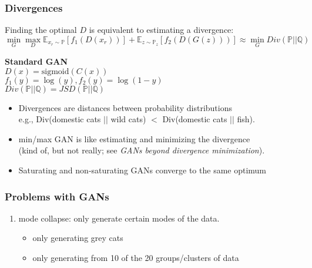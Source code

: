 \documentclass[t]{beamer}
\begin{document}

\begin{frame}
\frametitle{Divergences}
Finding the optimal $D$ is equivalent to estimating a divergence:
$$\min_G \max_D \mathbb{E}_{x_r \sim \mathbb{P}}\left[ f_1(D(x_r)) \right] + \mathbb{E}_{z \sim \mathbb{P}_z} \left[ f_2(D(G(z))) \right] \approx \min_G Div(\mathbb{P}||\mathbb{Q})$$ 

\begin{center}
	\textbf{Standard GAN} \\
	$D(x)=\text{sigmoid}(C(x))$ \\
	$f_1(y)=\log(y), f_2(y)=\log(1-y)$ \\
	$Div(\mathbb{P}||\mathbb{Q}) =  JSD(\mathbb{P}||\mathbb{Q})$
\end{center}

\begin{itemize}
	\item Divergences are distances between probability distributions \\ e.g., Div(domestic cats $||$ wild cats) $<$ Div(domestic cats $||$ fish).
	\item min/max GAN is like estimating and minimizing the divergence \\ (kind of, but not really; see \textit{GANs beyond divergence minimization}).
	\item Saturating and non-saturating GANs converge to the same optimum
\end{itemize}

\end{frame}


\begin{frame}
	\frametitle{Problems with GANs}
	
	\begin{enumerate}
		\item mode collapse: only generate certain modes of the data.
		\begin{itemize}
			\item only generating grey cats
			\item only generating from 10 of the 20 groups/clusters of data
		\end{itemize}
	\end{enumerate}
	
\end{frame}

\end{document}
